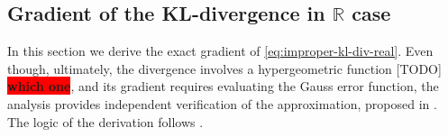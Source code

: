 \documentclass[a4paper,10pt]{article}
\newcommand{\real}{\mathbb{R}}
\newcommand{\important}[1]{\textbf{\!\colorbox{red}{#1}\!}}
\newcommand{\todo}[1]{{\color{blue} [TODO]} \important{#1}}
\begin{document}

\subsection{Gradient of the KL-divergence in $\real$ case} %
\label{sub:real-chisq-grad}  %

In this section we derive the exact gradient of \eqref{eq:improper-kl-div-real}. Even
though, ultimately, the divergence involves a hypergeometric function \todo{which one},
and its gradient requires evaluating the Gauss error function, the analysis provides
independent verification of the approximation, proposed in \citep{molchanov_variational_2017}.
The logic of the derivation follows \citep{lapidoth_capacity_2003}.
\end{document}
